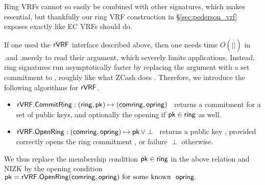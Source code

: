 
Ring VRFs cannot so easily be combined with other signatures, which
makes \aux essential,%
but thankfully our ring VRF construction in \S\ref{sec:pederson_vrf} exposes \aux exactly like EC VRFs should do.%


If one used the ${\mathsf{rVRF}}$ interface described above, then one needs time
$O(|\ring|)$ in \rVRF.\rSign and \rVRF.\rVerify merely to read their \ring
argument, which severely limits applications.
Instead, ring signatures run asymptotically faster by replacing the \ring
argument with a set commitment to \ring, roughly like what ZCash does \cite{zcash_protocol}. Therefore, we introduce the following algorithms for $ {\mathsf{rVRF}} $.
\begin{itemize}
\item ${\mathsf{rVRF}}.{\mathsf{CommitRing}} : (\mathsf{ring},\mathsf{pk}) \mapsto (\mathsf{comring},\mathsf{opring})$ \,
    returns a commitment for a set \ring of public keys, and
    optionally the opening \openring if $\mathsf{pk} \in \mathsf{ring}$ as well.
\item ${\mathsf{rVRF}}.{\mathsf{OpenRing}} : (\mathsf{comring},\mathsf{opring}) \mapsto \mathsf{pk} \, \lor \perp$ \,
    returns a public key \pk, provided \openring correctly opens
    the ring commitment \comring, or failure $\perp$ otherwise.
\end{itemize}

We thus replace the membership condition $\mathsf{pk} \in \mathsf{ring}$ in the above
relation and NIZK by the opening condition
$ \mathsf{pk} = {\mathsf{rVRF}}.{\mathsf{OpenRing}}(\mathsf{comring},\mathsf{opring}) \textrm{\ for some known \ } \mathsf{opring} . $
%

